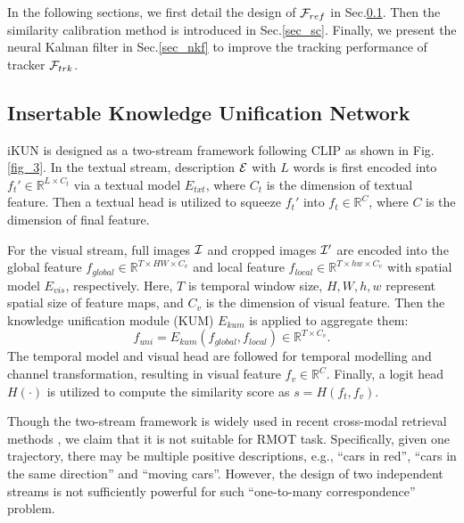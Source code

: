 \documentclass[10pt,twocolumn,letterpaper]{article}
\begin{document}
    In the following sections, we first detail the design of ${\cal F}_{ref}$ in Sec.\ref{sec_ikun}. 
    Then the similarity calibration method is introduced in Sec.\ref{sec_sc}.
    Finally, we present the neural Kalman filter in Sec.\ref{sec_nkf} to improve the tracking performance of tracker ${\cal F}_{trk}$.

\subsection{Insertable Knowledge Unification Network}
\label{sec_ikun}
    iKUN is designed as a two-stream framework following CLIP \cite{radford2021learning} as shown in Fig.\ref{fig_3}.
    In the textual stream, description $\cal E$ with $L$ words is first encoded into $f_t' \in \mathbb R^{L \times C_t}$ 
    via a textual model $E_{txt}$, where $C_t$ is the dimension of textual feature.
    Then a textual head is utilized to squeeze $f_t'$ into $f_t \in \mathbb R^{C}$, where $C$ is the dimension of final feature. 

    For the visual stream, full images $\cal I$ and cropped images $\cal I'$ are encoded 
    into the global feature $f_{global} \in \mathbb R^{T \times HW \times C_v}$ 
    and local feature $f_{local} \in \mathbb R^{T \times hw \times C_v}$ with spatial model $E_{vis}$, respectively.
    Here, $T$ is temporal window size, $H, W, h, w$ represent spatial size of feature maps, and $C_v$ is the dimension of visual feature.
    Then the knowledge unification module (KUM) $E_{kum}$ is applied to aggregate them:
    \begin{equation}
        f_{uni} = E_{kum}(f_{global}, f_{local}) \in \mathbb R^{T \times C_v}. \label{eq1}
    \end{equation}    
    The temporal model and visual head are followed for temporal modelling and channel transformation, resulting in visual feature $f_v \in \mathbb R^{C}$.
    Finally, a logit head $H(\cdot)$ is utilized to compute the similarity score as $s = H(f_t, f_v)$.

    Though the two-stream framework is widely used in recent cross-modal retrieval methods 
    \cite{ma2022x, chun2021probabilistic, jiang2023cross, yan2023image, li2022learning, yan2022clip}, 
    we claim that it is not suitable for RMOT task.
    Specifically, given one trajectory, there may be multiple positive descriptions, e.g., ``cars in red'', ``cars in the same direction'' and ``moving cars''.
    However, the design of two independent streams is not sufficiently powerful for such ``one-to-many correspondence'' problem.
\end{document}
